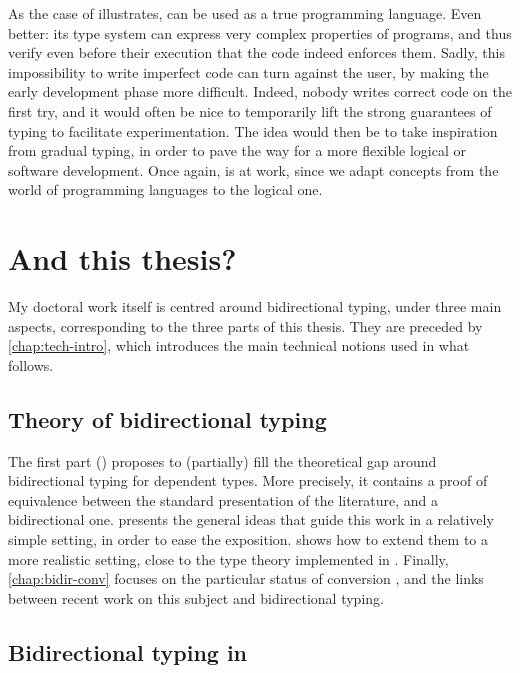 As the case of  illustrates,  can be used as a true programming language.
Even better: its type system can express very complex properties of programs, and thus
verify even before their execution that the code indeed enforces them.
Sadly, this impossibility to write imperfect code can turn against the user, by making the
early development phase more difficult. Indeed, nobody writes correct code on the first try,
and it would often be nice to temporarily lift the strong guarantees of typing to
facilitate experimentation. The idea would then be to take inspiration from gradual typing,
in order to pave the way for a more flexible logical or software development. Once again,
 is at work, since we adapt concepts from the world of
programming languages to the logical one.

\section{And this thesis?}
\label{sec:this-thesis}

My doctoral work itself is centred around bidirectional typing, under three main aspects,
corresponding to the three parts of this thesis.
They are preceded by \cref{chap:tech-intro}, which introduces the main technical notions
used in what follows.

\subsection{Theory of bidirectional typing}

The first part () proposes to (partially) fill the theoretical gap around
bidirectional typing for dependent types. More precisely, it contains a proof of equivalence
between the standard presentation of the literature, and a bidirectional one.
 presents the general ideas that guide this work in a relatively
simple setting, in order to ease the exposition.  shows how to extend
them to a more realistic setting, close to the type theory implemented in .
Finally, \cref{chap:bidir-conv} focuses on the particular status of conversion%
,
and the links between recent work on this subject and bidirectional typing.

\subsection{Bidirectional typing in }

